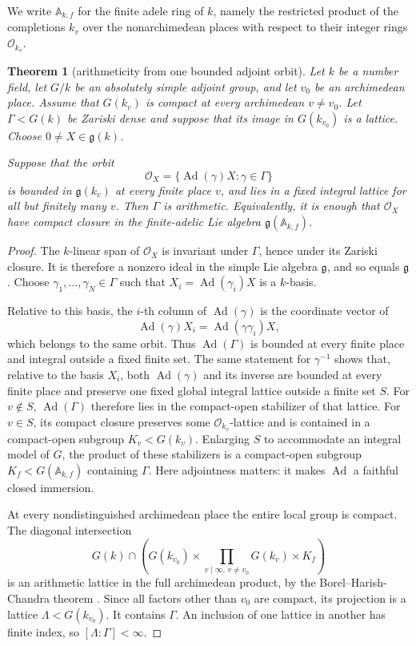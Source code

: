 \documentclass[11pt,reqno]{amsart}
\newtheorem{theorem}{Theorem}[section]
\theoremstyle{definition}
\theoremstyle{remark}
\newcommand{\cO}{\mathcal O}
\newcommand{\Ad}{\operatorname{Ad}}
\begin{document}
We write \(\mathbb A_{k,f}\) for the finite adele ring of \(k\), namely the
restricted product of the completions \(k_v\) over the nonarchimedean places
with respect to their integer rings \(\cO_{k_v}\).

\begin{theorem}[arithmeticity from one bounded adjoint orbit]
\label{thm:one-orbit}
Let \(k\) be a number field, let \(G/k\) be an absolutely simple adjoint
group, and let \(v_0\) be an archimedean place.  Assume that
\(G(k_v)\) is compact at every archimedean \(v\ne v_0\).  Let
\(\Gamma<G(k)\) be Zariski dense and suppose that its image in
\(G(k_{v_0})\) is a lattice.  Choose \(0\ne X\in\mathfrak g(k)\).

Suppose that the orbit
\[
 \mathcal O_X=\{\Ad(\gamma)X:\gamma\in\Gamma\}
\tag{11.3}
\]
is bounded in \(\mathfrak g(k_v)\) at every finite place \(v\), and lies in
a fixed integral lattice for all but finitely many \(v\).  Then \(\Gamma\)
is arithmetic.  Equivalently, it is enough that \(\mathcal O_X\) have
compact closure in the finite-adelic Lie algebra
\(\mathfrak g(\mathbb A_{k,f})\).
\end{theorem}

\begin{proof}
The \(k\)-linear span of \(\mathcal O_X\) is invariant under \(\Gamma\),
hence under its Zariski closure.  It is therefore a nonzero ideal in the
simple Lie algebra \(\mathfrak g\), and so equals \(\mathfrak g\).  Choose
\(\gamma_1,\ldots,\gamma_N\in\Gamma\) such that
\(X_i=\Ad(\gamma_i)X\) is a \(k\)-basis.

Relative to this basis, the \(i\)-th column of \(\Ad(\gamma)\) is the
coordinate vector of
\[
 \Ad(\gamma)X_i=\Ad(\gamma\gamma_i)X,
\]
which belongs to the same orbit.  Thus \(\Ad(\Gamma)\) is bounded at every
finite place and integral outside a fixed finite set.  The same statement
for \(\gamma^{-1}\) shows that, relative to the basis \(X_i\), both
\(\Ad(\gamma)\) and its inverse are bounded at every finite place and
preserve one fixed global integral lattice outside a finite set \(S\).
For \(v\notin S\), \(\Ad(\Gamma)\) therefore lies in the compact-open
stabilizer of that lattice.  For \(v\in S\), its compact closure preserves
some \(\cO_{k_v}\)-lattice and is contained in a compact-open subgroup
\(K_v<G(k_v)\).  Enlarging \(S\) to accommodate an integral model of
\(G\), the product of these stabilizers is a compact-open subgroup
\(K_f<G(\mathbb A_{k,f})\) containing \(\Gamma\).  Here adjointness matters:
it makes \(\Ad\) a faithful closed immersion.

At every nondistinguished archimedean place the entire local group is compact.
The diagonal intersection
\[
 G(k)\cap\left(G(k_{v_0})\times
      \prod_{v\mid\infty,\,v\ne v_0}G(k_v)\times K_f\right)
\]
is an arithmetic lattice in the full archimedean product, by the
Borel--Harish-Chandra theorem \cite{BorelHarishChandra}.  Since all factors other than \(v_0\) are
compact, its projection is a lattice \(\Lambda<G(k_{v_0})\).  It contains
\(\Gamma\).  An inclusion of one lattice in another has finite index, so
\([\Lambda:\Gamma]<\infty\).
\end{proof}
\end{document}
